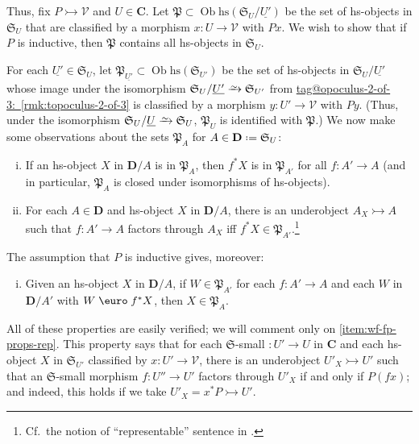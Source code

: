 \documentclass{amsart}
\makeatletter
\newcommand\bC{\mathbf{C}}
\newcommand\bD{\mathbf{D}}
\newcommand\cV{\mathcal{V}}
\newcommand\defeq{\mathrel{\vcenter{\baselineskip0.5ex \lineskiplimit0pt \hbox{.}\hbox{.}}} =}
\newcommand\Ein{\mathrel{\text{\textup{\euro}}}}
\newcommand\fP{\mathfrak{P}}
\newcommand\fS{\mathfrak{S}}
\newcommand\hs{\mathrm{hs}}
\newcommand\Ob{\operatorname{Ob}}
\newcommand\toi{\xrightarrow{\raisebox{-2.5pt}[0pt][0pt]{\ensuremath{\scriptstyle{\sim}}}}}
\newcommand\tto{\rightarrowtail}
\newcommand\und[1]{\underline{#1}}
\newcommand\tagword[1]{\csname tag@#1\endcsname}
\def\label@tag#1:#2\@nil{#1}
\newcommand\labeltag[1]{\label@tag#1:\@nil}
\newcommand\jref[1]{%
  \texorpdfstring%
    {\hyperref[#1]{\tagword{\labeltag{#1}}~\ref*{#1}}}%
    {\tagword{\labeltag{#1}}~\ref*{#1}}%
}
\theoremstyle{definition}
\theoremstyle{remark}
\theoremstyle{plainwithref}
\makeatother
\begin{document}
Thus, fix \( P \tto \cV \) and \( U \in \bC \).
Let \( \fP \subset \Ob \hs(\fS_U / \und{U'}) \) be the set of hs-objects in \( \fS_{U} \) that are classified by a morphism \( x \colon U \to \cV \) with \( P x \).
We wish to show that if \( P \) is inductive, then \( \fP \) contains all hs-objects in \( \fS_{U} \).

For each \( \und{U'} \in \fS_{U} \), let \( \fP_{\und{U'}} \subset \Ob \hs(\fS_{U'}) \) be the set of hs-objects in \( \fS_{U} / \und{U'} \) whose image under the isomorphism \( \fS_{U} / \und{U'} \toi \fS_{U'} \) from \jref{rmk:topoculus-2-of-3} is classified by a morphism \( y \colon U' \to \cV \) with \( P y \).
(Thus, under the isomorphism \( \fS_{U} / \und U \toi \fS_U \), \( \fP_U \) is identified with \( \fP \).)
We now make some observations about the sets \( \fP_A \) for \( A \in \bD \defeq \fS_{U} \):
\begin{enumerate}[(i)]
\item\label{item:wf-fp-props-first} \label{item:wf-fp-props-stable} If an hs-object \( X \) in \( \bD / A \) is in \( \fP_A \), then \( f^*X \) is in \( \fP_{A'} \) for all \( f \colon A' \to A \) (and in particular, \( \fP_A \) is closed under isomorphisms of hs-objects).
\item\label{item:wf-fp-props-rep} For each \( A \in \bD \) and hs-object \( X \) in \( \bD / A \), there is an underobject \( A_X \tto A \) such that \( f \colon A' \to A \) factors through \( A_X \) iff \( f^*X \in \fP_{A'} \).\footnote{%
    \label{footnote:stack-semantics-repr}
    Cf.\ the notion of ``representable'' sentence in \cite{shulman-stack-semantics}.
  }
\end{enumerate}
The assumption that \( P \) is inductive gives, moreover:
\begin{enumerate}[(i), resume]
\item\label{item:wf-fp-props-last} \label{item:wf-fp-props-inductive} Given an hs-object \( X \) in \( \bD / A \), if \( W \in \fP_{A'} \) for each \( f \colon A' \to A \) and each \( W \) in \( \bD / A' \) with \( W \Ein f^* X \), then \( X \in \fP_A \).
\end{enumerate}
All of these properties are easily verified; we will comment only on \ref{item:wf-fp-props-rep}.
This property says that for each \( \fS \)-small \( \colon U' \to U \) in \( \bC \) and each hs-object \( X \) in \( \fS_{U'} \) classified by \( x \colon U' \to \cV \), there is an underobject \( U'_X \tto U' \) such that an \( \fS \)-small morphism \( f \colon U'' \to U' \) factors through \( U'_X \) if and only if \( P (f x) \); and indeed, this holds if we take \( U'_X = x^* P \tto U' \).
\end{document}
